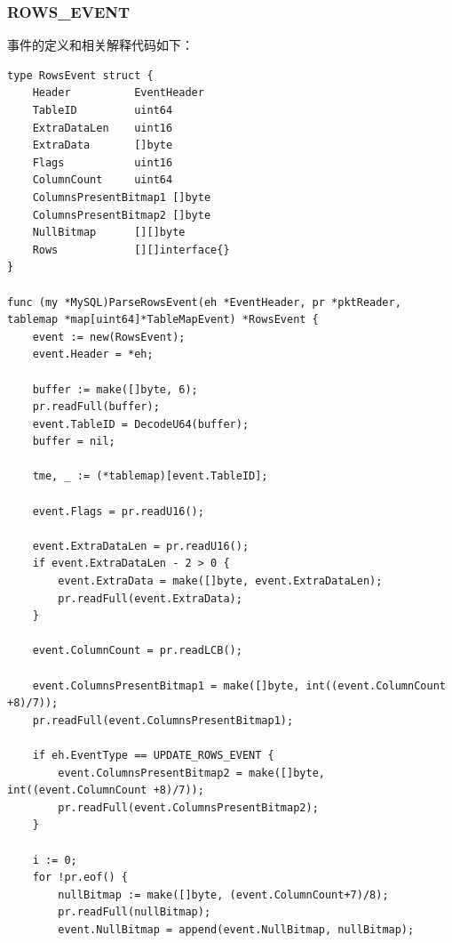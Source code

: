 \documentclass[a4paper, titlepage, 10pt, bookmark]{article}
\begin{document}
\subsubsection{ROWS\_EVENT}
事件的定义和相关解释代码如下：
\begin{spacing}{1.0}
\begin{lstlisting}
type RowsEvent struct {
    Header          EventHeader
    TableID         uint64
    ExtraDataLen    uint16
    ExtraData       []byte
    Flags           uint16
    ColumnCount     uint64
    ColumnsPresentBitmap1 []byte
    ColumnsPresentBitmap2 []byte
    NullBitmap      [][]byte
    Rows            [][]interface{}
}

func (my *MySQL)ParseRowsEvent(eh *EventHeader, pr *pktReader, tablemap *map[uint64]*TableMapEvent) *RowsEvent {
    event := new(RowsEvent);
    event.Header = *eh;

    buffer := make([]byte, 6);
    pr.readFull(buffer);
    event.TableID = DecodeU64(buffer);
    buffer = nil;

    tme, _ := (*tablemap)[event.TableID];

    event.Flags = pr.readU16();

    event.ExtraDataLen = pr.readU16();
    if event.ExtraDataLen - 2 > 0 {
        event.ExtraData = make([]byte, event.ExtraDataLen);
        pr.readFull(event.ExtraData);
    }

    event.ColumnCount = pr.readLCB();

    event.ColumnsPresentBitmap1 = make([]byte, int((event.ColumnCount +8)/7));
    pr.readFull(event.ColumnsPresentBitmap1);

    if eh.EventType == UPDATE_ROWS_EVENT {
        event.ColumnsPresentBitmap2 = make([]byte, int((event.ColumnCount +8)/7));
        pr.readFull(event.ColumnsPresentBitmap2);
    }

    i := 0;
    for !pr.eof() {
        nullBitmap := make([]byte, (event.ColumnCount+7)/8);
        pr.readFull(nullBitmap);
        event.NullBitmap = append(event.NullBitmap, nullBitmap);
        

\end{lstlisting}
\end{spacing}
\end{document}
